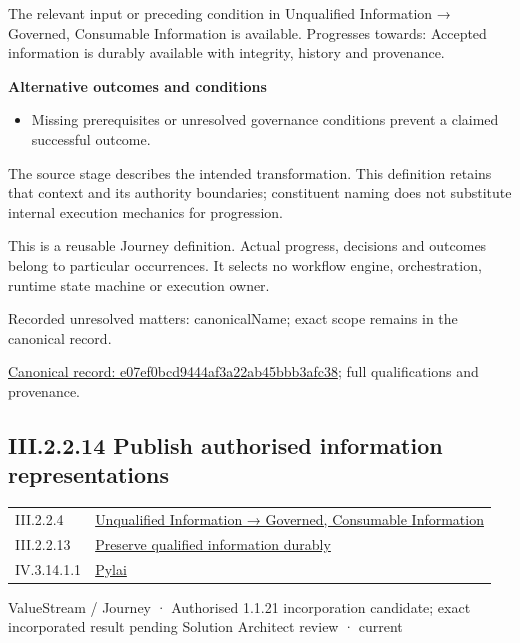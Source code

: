The relevant input or preceding condition in Unqualified Information → Governed, Consumable Information is available. Progresses towards: Accepted information is durably available with integrity, history and provenance.



\par\medskip\textbf{Alternative outcomes and conditions}\par


\begin{itemize}


\item Missing prerequisites or unresolved governance conditions prevent a claimed successful outcome.

\end{itemize}


The source stage describes the intended transformation. This definition retains that context and its authority boundaries; constituent naming does not substitute internal execution mechanics for progression.



This is a reusable Journey definition. Actual progress, decisions and outcomes belong to particular occurrences. It selects no workflow engine, orchestration, runtime state machine or execution owner.


{\small Recorded unresolved matters: canonicalName; exact scope remains in the canonical record.}\par
{\footnotesize \href{../../../../continuum/strategy/value-stream/e07ef0bcd9444af3a22ab45bbb3afc38.md}{Canonical record: e07ef0bcd9444af3a22ab45bbb3afc38}; full qualifications and provenance.}\par
\subsection*{III.2.2.14 Publish authorised information representations}
\label{navigation:III.2.2.14}

\begin{longtable}{p{.22\linewidth}p{.73\linewidth}}
III.2.2.4 & \hyperref[element:02e036f18bab400bac261007e39457ee]{Unqualified Information → Governed, Consumable Information} \\
III.2.2.13 & \hyperref[element:e07ef0bcd9444af3a22ab45bbb3afc38]{Preserve qualified information durably} \\
IV.3.14.1.1 & \hyperref[element:e3e4147fea3640198dc251ed41ee854d]{Pylai} \\
\end{longtable}
\label{element:91da459e860e4f359e440a65f0c94bcb}
{\small ValueStream / Journey · Authorised 1.1.21 incorporation candidate; exact incorporated result pending Solution Architect review · current}\par


